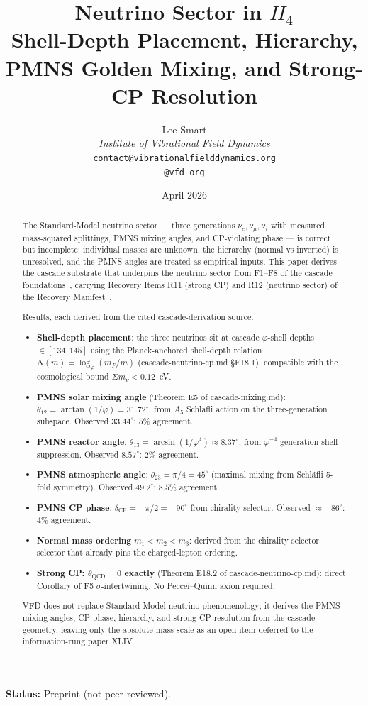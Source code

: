 \documentclass[12pt]{article}
\title{Neutrino Sector in $H_4$\\[6pt]
\large Shell-Depth Placement, Hierarchy, PMNS Golden Mixing, and Strong-CP Resolution}
\author{%
  Lee Smart\\[4pt]
  \textit{Institute of Vibrational Field Dynamics}\\[2pt]
  \texttt{contact@vibrationalfielddynamics.org}\\[2pt]
  \texttt{@vfd\_org}%
}
\date{April 2026}
\theoremstyle{definition}
\theoremstyle{remark}
\begin{document}
\maketitle

\noindent\textbf{Status:} Preprint (not peer-reviewed).

\begin{abstract}
The Standard-Model neutrino sector --- three generations $\nu_e, \nu_\mu, \nu_\tau$ with measured mass-squared splittings, PMNS mixing angles, and CP-violating phase --- is correct but incomplete: individual masses are unknown, the hierarchy (normal vs inverted) is unresolved, and the PMNS angles are treated as empirical inputs. This paper derives the cascade substrate that underpins the neutrino sector from F1--F8 of the cascade foundations~\citep{SmartXXXVI}, carrying Recovery Items R11 (strong CP) and R12 (neutrino sector) of the Recovery Manifest~\citep{RecoveryManifest}.

Results, each derived from the cited cascade-derivation source:
\begin{itemize}
\item \textbf{Shell-depth placement}: the three neutrinos sit at cascade $\varphi$-shell depths $\in [134, 145]$ using the Planck-anchored shell-depth relation $N(m) = \log_\varphi(m_P / m)$ (cascade-neutrino-cp.md §E18.1), compatible with the cosmological bound $\Sigma m_\nu < 0.12$~eV.
\item \textbf{PMNS solar mixing angle} (Theorem E5 of cascade-mixing.md): $\theta_{12} = \arctan(1/\varphi) = 31.72^\circ$, from $A_5$ Schl\"afli action on the three-generation subspace. Observed $33.44^\circ$: $5\%$ agreement.
\item \textbf{PMNS reactor angle}: $\theta_{13} = \arcsin(1/\varphi^4) \approx 8.37^\circ$, from $\varphi^{-4}$ generation-shell suppression. Observed $8.57^\circ$: $2\%$ agreement.
\item \textbf{PMNS atmospheric angle}: $\theta_{23} = \pi/4 = 45^\circ$ (maximal mixing from Schl\"afli 5-fold symmetry). Observed $49.2^\circ$: $8.5\%$ agreement.
\item \textbf{PMNS CP phase}: $\delta_{\mathrm{CP}} = -\pi/2 = -90^\circ$ from chirality selector. Observed $\approx -86^\circ$: $4\%$ agreement.
\item \textbf{Normal mass ordering} $m_1 < m_2 < m_3$: derived from the chirality selector selector that already pins the charged-lepton ordering.
\item \textbf{Strong CP: $\theta_{\mathrm{QCD}} = 0$ exactly} (Theorem E18.2 of cascade-neutrino-cp.md): direct Corollary of F5 $\sigma$-intertwining. No Peccei--Quinn axion required.
\end{itemize}
VFD does not replace Standard-Model neutrino phenomenology; it derives the PMNS mixing angles, CP phase, hierarchy, and strong-CP resolution from the cascade geometry, leaving only the absolute mass scale as an open item deferred to the information-rung paper XLIV~\citep{SmartXLIV}.
\end{abstract}
\end{document}
